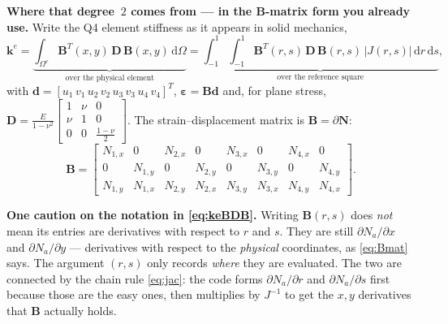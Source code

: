 \documentclass[11pt]{article}
\newcommand{\dOm}{\,\mathrm{d}\Omega}
\begin{document}
\medskip
\noindent
\textbf{Where that degree~$2$ comes from --- in the $\bm{B}$-matrix form you
already use.} Write the Q4 element stiffness as it appears in solid mechanics,
\begin{equation}\label{eq:keBDB}
  \bm{k}^{e}=\underbrace{\int_{\Omega^{e}}
             \bm{B}^{T}\!(x,y)\,\bm{D}\,\bm{B}(x,y)\dOm}
             _{\text{over the physical element}}
           =\underbrace{\int_{-1}^{1}\!\!\int_{-1}^{1}
             \bm{B}^{T}\!(r,s)\,\bm{D}\,\bm{B}(r,s)\,
             \bigl|J(r,s)\bigr|\,\mathrm{d}r\,\mathrm{d}s}
             _{\text{over the reference square}} ,
\end{equation}
with $\bm{d}=[u_{1}\,v_{1}\,u_{2}\,v_{2}\,u_{3}\,v_{3}\,u_{4}\,v_{4}]^{T}$,
$\bm{\varepsilon}=\bm{B}\bm{d}$ and, for plane stress,
$\bm{D}=\frac{E}{1-\nu^{2}}
\left[\begin{smallmatrix}1&\nu&0\\ \nu&1&0\\ 0&0&\frac{1-\nu}{2}\end{smallmatrix}\right]$.
The strain--displacement matrix is $\bm{B}=\partial\bm{N}$:
\begin{equation}\label{eq:Bmat}
  \bm{B}=
  \begin{bmatrix}
    N_{1,x} & 0       & N_{2,x} & 0       & N_{3,x} & 0       & N_{4,x} & 0\\
    0       & N_{1,y} & 0       & N_{2,y} & 0       & N_{3,y} & 0       & N_{4,y}\\
    N_{1,y} & N_{1,x} & N_{2,y} & N_{2,x} & N_{3,y} & N_{3,x} & N_{4,y} & N_{4,x}
  \end{bmatrix}.
\end{equation}

\medskip
\noindent
\textbf{One caution on the notation in \eqref{eq:keBDB}.} Writing
$\bm{B}(r,s)$ does \emph{not} mean its entries are derivatives with respect to
$r$ and $s$. They are still $\partial N_{a}/\partial x$ and
$\partial N_{a}/\partial y$ --- derivatives with respect to the \emph{physical}
coordinates, as \eqref{eq:Bmat} says. The argument $(r,s)$ only records
\emph{where} they are evaluated. The two are connected by the chain rule
\eqref{eq:jac}: the code forms $\partial N_{a}/\partial r$ and
$\partial N_{a}/\partial s$ first because those are the easy ones, then
multiplies by $J^{-1}$ to get the $x,y$ derivatives that $\bm{B}$ actually
holds.
\end{document}
